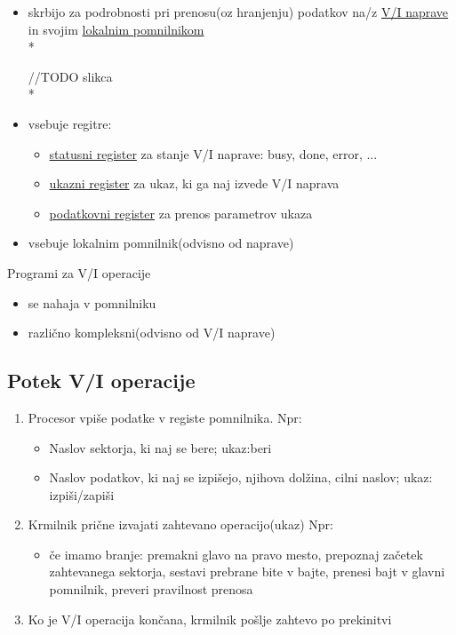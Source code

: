 \documentclass[
  slovene,
  a4paper
]{book}
\begin{document}
\begin{itemize}
  \item skrbijo za podrobnosti pri prenosu(oz hranjenju) podatkov na/z \underline{V/I naprave} in svojim \underline{lokalnim pomnilnikom}\\*
  
//TODO slikca\\*

  \item vsebuje regitre:
    \begin{itemize}
      \item \underline{statusni register} za stanje V/I naprave: busy, done, error, ...
      \item \underline{ukazni register} za ukaz, ki ga naj izvede V/I naprava
      \item \underline{podatkovni register} za prenos parametrov ukaza
    \end{itemize}
  \item vsebuje lokalnim pomnilnik(odvisno od naprave)
\end{itemize}

Programi za V/I operacije
\begin{itemize}
  \item se nahaja v pomnilniku
  \item različno kompleksni(odvisno od V/I naprave)
\end{itemize}

\subsection{Potek V/I operacije}

\begin{enumerate}
  \item Procesor vpiše podatke v registe pomnilnika. Npr:
    \begin{itemize}
      \item Naslov sektorja, ki naj se bere; ukaz:beri
      \item Naslov podatkov, ki naj se izpišejo, njihova dolžina, cilni naslov; ukaz: izpiši/zapiši
    \end{itemize}
  \item Krmilnik prične izvajati zahtevano operacijo(ukaz) Npr:
    \begin{itemize}
      \item če imamo branje: premakni glavo na pravo mesto, prepoznaj začetek zahtevanega sektorja, sestavi prebrane bite v bajte, prenesi bajt v glavni pomnilnik, preveri pravilnost prenosa
    \end{itemize}
  \item Ko je V/I operacija končana, krmilnik pošlje zahtevo po prekinitvi
\end{enumerate}
  
\end{document}
